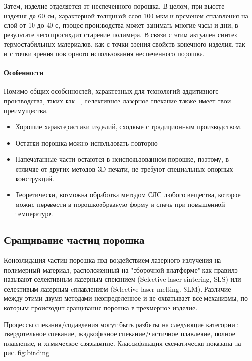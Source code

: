 Затем, изделие отделяется от неспеченного порошка. В целом, при высоте изделия до 60 см, характерной толщиной слоя 100 мкм и временем сплавления на слой от 10 до 40 с, процес производства может занимать многие часы и дни, в результате чего просихдит старение полимера. В связи с этим актуален синтез термостабильных материалов, как с точки зрения свойств конечного изделия, так и с точки зрения повторного использования неспеченного порошка.

\paragraph{Особенности}
Помимо общих особенностей, характерных для технологий аддитивного производства, таких как..., селективное лазерное спекание также имеет свои преимущества.
\begin{itemize}
    \item Хорошие характеристики изделий, сходные с традиционным производством.
    \item Остатки порошка можно использовать повторно
    \item Напечатанные части остаются в неиспользованном порошке, поэтому, в отличие от других методов 3D-печати, не требуют специальных опорных конструкций.
    \item Теоретически, возможна обработка методом СЛС любого вещества, которое можно перевести в порошкообразную форму и спечь при повышенной температуре\cite{vaganov}.
\end{itemize}

\subsection{Сращивание частиц порошка}
Консолидация частиц порошка под воздействием лазерного излучения на полимерный материал, расположенный на "сборочной платформе" как правило называют селективным лазерным спеканием (Selective laser sintering, SLS) или селективым лазерным cплавлением (Selective laser melting, SLM). Различие между этими двумя методами неопределенное и не охватывает все механизмы, по которым происходит сращивание порошка в трехмерное изделие.

Процессы спекания/спдавдения могут быть разбиты на следующие категории \cite{comp-review, consolidation}: твердотельное спекание, жидкофазное спекание/частичное плавление, полное плавление, и химическое связывание. Классификация схематически показана на рис.\ref{fig:binding}



